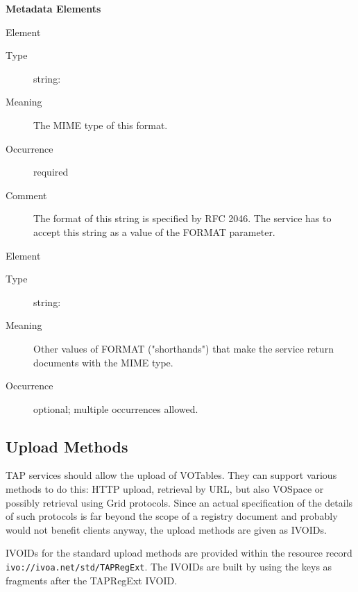 \documentclass{ivoa}
\begin{document}
\vspace{0.5ex}\noindent\textbf{ Metadata Elements}

\begingroup\small\begin{bigdescription}\item[Element \xmlel{mime}]
\begin{description}
\item[Type] string: 
\item[Meaning] 
          The MIME type of this format.
          
\item[Occurrence] required
\item[Comment] 
          The format of this string is specified by RFC 2046.
          The service has to accept this string as a 
          value of the FORMAT parameter.
          

\end{description}
\item[Element \xmlel{alias}]
\begin{description}
\item[Type] string: 
\item[Meaning] 
          Other values of FORMAT ("shorthands") that make the service return 
          documents with the MIME type.
          
\item[Occurrence] optional; multiple occurrences allowed.

\end{description}


\end{bigdescription}\endgroup

\endgroup

\subsection{Upload Methods}

\label{uploadmethods}

TAP services should allow the upload of VOTables.  They can support
various methods to do this: HTTP upload, retrieval by URL, but also VOSpace
or possibly retrieval using Grid protocols.  Since an actual specification
of the details of such protocols is far beyond the scope of a registry
document and probably would not benefit clients anyway, the upload
methods are given as IVOIDs.

IVOIDs for the standard upload methods are provided within the
resource record
\texttt{ivo://ivoa.net/std/TAPRegExt}.  
The IVOIDs are built by using the keys as fragments after the 
TAPRegExt IVOID.
\end{document}
